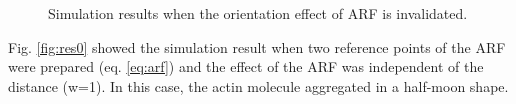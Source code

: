 \documentclass[a4paper,12pt, oneside]{book}
\begin{document}
\begin{figure}[tbp]
 \caption{Simulation results when the orientation effect of ARF is invalidated.}
 \label{fig:res4}
\end{figure}

Fig. \ref{fig:res0} showed the simulation result when two reference points of the ARF were prepared (eq. \ref{eq:arf}) and the effect of the ARF was independent of the distance (w=1).
In this case, the actin molecule aggregated in a half-moon shape.
\end{document}
